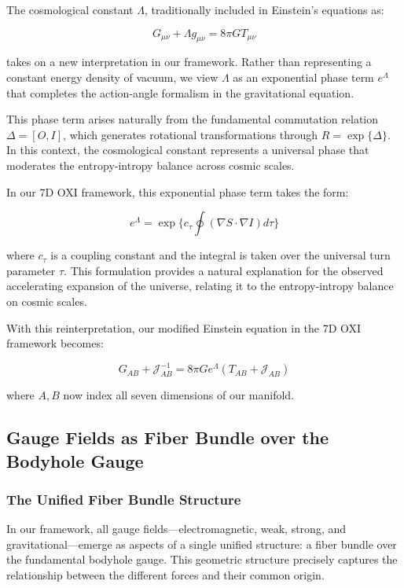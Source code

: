 \documentclass{article}
\begin{document}
The cosmological constant $\Lambda$, traditionally included in Einstein's equations as:

\begin{equation}
G_{\mu\nu} + \Lambda g_{\mu\nu} = 8\pi G T_{\mu\nu}
\end{equation}

takes on a new interpretation in our framework. Rather than representing a constant energy density of vacuum, we view $\Lambda$ as an exponential phase term $e^{\Lambda}$ that completes the action-angle formalism in the gravitational equation.

This phase term arises naturally from the fundamental commutation relation $\Delta = [O, I]$, which generates rotational transformations through $R = \exp\{\Delta\}$. In this context, the cosmological constant represents a universal phase that moderates the entropy-intropy balance across cosmic scales.

In our 7D OXI framework, this exponential phase term takes the form:

\begin{equation}
e^{\Lambda} = \exp\{c_{\tau} \oint (\nabla S \cdot \nabla I) d\tau\}
\end{equation}

where $c_{\tau}$ is a coupling constant and the integral is taken over the universal turn parameter $\tau$. This formulation provides a natural explanation for the observed accelerating expansion of the universe, relating it to the entropy-intropy balance on cosmic scales.

With this reinterpretation, our modified Einstein equation in the 7D OXI framework becomes:

\begin{equation}
G_{AB} + \mathcal{J}^{-1}_{AB} = 8\pi G e^{\Lambda} (T_{AB} + \mathcal{J}_{AB})
\end{equation}

where $A, B$ now index all seven dimensions of our manifold. 

\subsection{Gauge Fields as Fiber Bundle over the Bodyhole Gauge}

\subsubsection{The Unified Fiber Bundle Structure}

In our framework, all gauge fields—electromagnetic, weak, strong, and gravitational—emerge as aspects of a single unified structure: a fiber bundle over the fundamental bodyhole gauge. This geometric structure precisely captures the relationship between the different forces and their common origin.
\end{document}
